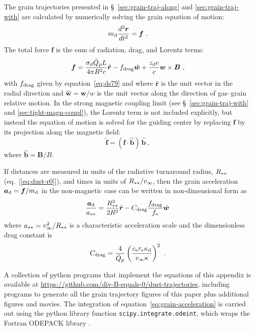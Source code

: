 The grain trajectories presented in \S~\ref{sec:grain-traj-along} and
\ref{sec:grain-traj-with} are calculated by numerically solving the
grain equation of motion:
\begin{equation}
  \label{eq:grain-equation-motion}
  m_{\text{d}} \frac{d^2 \bm{r}}{d t^2} = \bm{f} \ .
\end{equation}
The total force \(\bm{f}\) is the sum of radiation, drag, and Lorentz
terms:
\begin{equation}
  \label{eq:total-force}
  \bm{f} = \frac{\sigma_{\text{d}} \bar{Q}_{\text{p}} L}{4\pi R^2 c} \hat{\bm{r}}
  - f_{\text{drag}} \hat{\bm{w}}
  + \frac{z_{\text{d}} e}{c} \bm{w} \times \bm{B} \ ,
\end{equation}
with \(f_{\text{drag}}\) given by equation~\eqref{eq:ds79} and where
\(\hat{\bm{r}}\) is the unit vector in the radial direction and
\(\hat{\bm{w}} = \bm{w} / w\) is the unit vector along the direction
of gas--grain relative motion.  In the strong magnetic coupling limit
(see \S~\ref{sec:grain-traj-with} and \ref{sec:tight-magn-coupl}), the
Lorentz term is not included explicitly, but instead the equation of
motion is solved for the guiding center by replacing \(\bm{f}\) by its
projection along the magnetic field: 
\begin{equation}
  \label{eq:projected-force}
  \widetilde{\bm{f}} = (\bm{f} \cdot \hat{\bm{b}})  \, \hat{\bm{b}} \ ,
\end{equation}
where \(\hat{\bm{b}} = \bm{B} / B\).

If distances are measured in units of the radiative turnaround radius,
\(R_{**}\) (eq.~[\ref{eq:dust-r0}]), and times in units of
\(R_{**} / v_\infty\), then the grain acceleration
\(\bm{a}_{\text{d}} = \bm{f} / m_{\text{d}}\) in the non-magnetic case can be
written in non-dimensional form as
\begin{equation}
  \label{eq:grain-acceleration}
  \frac{\bm{a}_{\text{d}}}{a_{**}}
  = \frac{R_{**}^2}{2 R^{2}} \hat{\bm{r}}
  - C_{\text{drag}} \frac{f_{\text{drag}}}{f_*} \hat{\bm{w}} \, 
\end{equation}
where \(a_{**} = v_\infty^2 / R_{**}\) is a characteristic
acceleration scale and the dimensionless drag constant is
\begin{equation}
  \label{eq:drag-constant}
  C_{\text{drag}} = \frac{4}{\bar{Q}_{\text{p}}} \left(\frac{c_{\text{s}} \tau_* \kappa_{\text{d}}}{v_\infty \kappa}\right)^2 \ .
\end{equation}

A collection of python programs that implement the equations of this
appendix is available at
\url{https://github.com/div-B-equals-0/dust-trajectories}, including
programs to generate all the grain trajectory figures of this paper
plus additional figures and movies.  The integration of
equation~\eqref{eq:grain-acceleration} is carried out using the
python library function \texttt{scipy.integrate.odeint}, which wraps
the Fortran ODEPACK library \citep{Hindmarsh:1983a, Jones:2001a}.

